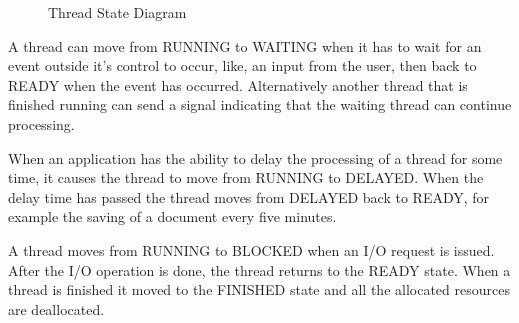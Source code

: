 \documentclass[12pt letter]{report}
\begin{document}
\begin{figure}[htpb]
  \centering
  \caption{Thread State Diagram}
\end{figure}

A thread can move from RUNNING to WAITING when it has to wait for an
event outside it's control to occur, like, an
input from the user, then back to READY when the event has occurred.
Alternatively another thread that is finished running can send a
signal indicating that the waiting thread can continue processing.

When an application has the ability to delay the processing of a
thread for some time, it causes the thread to move from RUNNING to
DELAYED. When the delay time has passed the thread moves from DELAYED
back to READY, for example the saving of a document every five minutes.

A thread moves from RUNNING to BLOCKED when an I/O request is issued.
After the I/O operation is done, the thread returns to the READY
state. When a thread is finished it moved to the FINISHED state and
all the allocated resources are deallocated.
\end{document}
